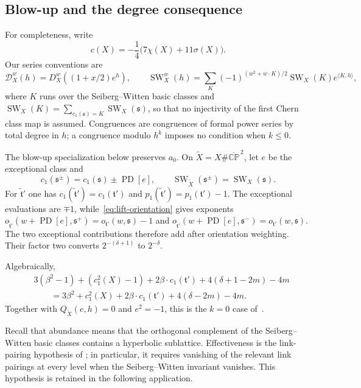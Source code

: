 \documentclass[11pt]{amsart}
\theoremstyle{definition}
\theoremstyle{remark}
\theoremstyle{plain}
\newcommand{\cD}{\mathcal{D}}
\newcommand{\SW}{\operatorname{SW}}
\begin{document}
\subsection{Blow-up and the degree consequence}
For completeness, write
\[
 c(X)=-\frac14\bigl(7\chi(X)+11\sigma(X)\bigr).
\]
Our series conventions are
\[
 \cD_X^w(h)=D_X^w((1+x/2)e^h),\qquad
 \SW_X^w(h)=\sum_{K}(-1)^{(w^2+w\cdot K)/2}
 \SW_X(K)e^{\langle K,h\rangle},
\]
where $K$ runs over the Seiberg--Witten basic classes and
$\SW_X(K)=\sum_{c_1(\mathfrak s)=K}\SW_X(\mathfrak s)$, so that no
injectivity of the first Chern class map is assumed.  Congruences are
congruences of formal power series by total degree in $h$; a congruence
modulo $h^k$ imposes no condition when $k\leq0$.

The blow-up specialization below preserves $a_0$.  On $\widetilde X=X\#\overline{\mathbb{CP}}^{\,2}$, let $e$ be the
exceptional class and
\[
 c_1(\mathfrak s^\pm)=c_1(\mathfrak s)\pm\operatorname{PD}[e],\qquad
 \SW_{\widetilde X}(\mathfrak s^\pm)=\SW_X(\mathfrak s).
\]
For $\widetilde{\mathfrak t}'$ one has
$c_1(\widetilde{\mathfrak t}')=c_1(\mathfrak t')$ and
$p_1(\widetilde{\mathfrak t}')=p_1(\mathfrak t')-1$.  The exceptional
evaluations are $\mp1$, while~\eqref{eq:lift-orientation} gives exponents
$o_{\widetilde{\mathfrak t}'}(w+\operatorname{PD}[e],\mathfrak s^+)
=o_{\mathfrak t'}(w,\mathfrak s)-1$ and
$o_{\widetilde{\mathfrak t}'}(w+\operatorname{PD}[e],\mathfrak s^-)
=o_{\mathfrak t'}(w,\mathfrak s)$.  The two exceptional contributions
therefore add after orientation weighting.  Their factor two converts
$2^{-(\delta+1)}$ to $2^{-\delta}$.

Algebraically,
\begin{align*}
&3(\beta^2-1)+(c_1^2(X)-1)+2\beta\cdot c_1(\mathfrak t')
 +4(\delta+1-2m)-4m\\
&\qquad=3\beta^2+c_1^2(X)+2\beta\cdot c_1(\mathfrak t')
 +4(\delta-2m)-4m.
\end{align*}
Together with $Q_{\widetilde X}(e,h)=0$ and $e^2=-1$, this is the $k=0$
case of~\cite[Proposition~6.5]{FeehanLenessLevelOne}.

Recall that abundance means that the orthogonal complement of the
Seiberg--Witten basic classes contains a hyperbolic sublattice.
Effectiveness is the link-pairing hypothesis of
\cite[Definitions~1.2--1.3]{FeehanLenessLevelOne}; in particular, it
requires vanishing of the relevant link pairings at every level when
the Seiberg--Witten invariant vanishes.  This hypothesis is retained
in the following application.
\end{document}
